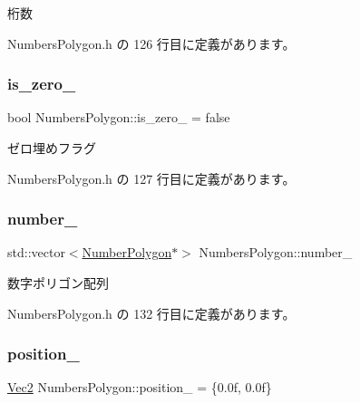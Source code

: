 桁数 



 Numbers\+Polygon.\+h の 126 行目に定義があります。

\mbox{\label{class_numbers_polygon_abd2e99321b113319c1800fc94fe280e3}} 
\subsubsection{\texorpdfstring{is\+\_\+zero\+\_\+}{is\_zero\_}}
{\footnotesize\ttfamily bool Numbers\+Polygon\+::is\+\_\+zero\+\_\+ = false\hspace{0.3cm}{\ttfamily [private]}}



ゼロ埋めフラグ 



 Numbers\+Polygon.\+h の 127 行目に定義があります。

\mbox{\label{class_numbers_polygon_a2b613d51e8c7bf7cada11eb546c669e7}} 
\subsubsection{\texorpdfstring{number\+\_\+}{number\_}}
{\footnotesize\ttfamily std\+::vector$<$\mbox{\hyperlink{class_numbers_polygon_1_1_number_polygon}{Number\+Polygon}}$\ast$$>$ Numbers\+Polygon\+::number\+\_\+\hspace{0.3cm}{\ttfamily [private]}}



数字ポリゴン配列 



 Numbers\+Polygon.\+h の 132 行目に定義があります。

\mbox{\label{class_numbers_polygon_a72185b3231ae47ebbd5e4206230b342c}} 
\subsubsection{\texorpdfstring{position\+\_\+}{position\_}}
{\footnotesize\ttfamily \mbox{\hyperlink{_vector3_d_8h_a5ef6e95dfc5f9d3820b71772d99bbc25}{Vec2}} Numbers\+Polygon\+::position\+\_\+ = \{0.\+0f, 0.\+0f\}\hspace{0.3cm}{\ttfamily [private]}}




